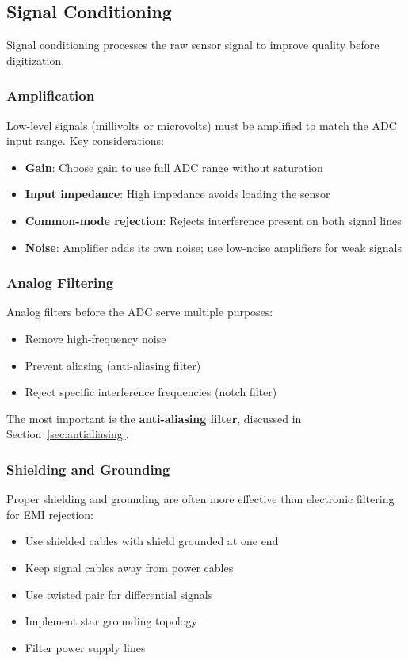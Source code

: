\subsection{Signal Conditioning}

Signal conditioning processes the raw sensor signal to improve quality before digitization.

\subsubsection{Amplification}

Low-level signals (millivolts or microvolts) must be amplified to match the ADC input range. Key considerations:
\begin{itemize}
    \item \textbf{Gain}: Choose gain to use full ADC range without saturation
    \item \textbf{Input impedance}: High impedance avoids loading the sensor
    \item \textbf{Common-mode rejection}: Rejects interference present on both signal lines
    \item \textbf{Noise}: Amplifier adds its own noise; use low-noise amplifiers for weak signals
\end{itemize}

\subsubsection{Analog Filtering}

Analog filters before the ADC serve multiple purposes:
\begin{itemize}
    \item Remove high-frequency noise
    \item Prevent aliasing (anti-aliasing filter)
    \item Reject specific interference frequencies (notch filter)
\end{itemize}

The most important is the \textbf{anti-aliasing filter}, discussed in Section~\ref{sec:antialiasing}.

\subsubsection{Shielding and Grounding}

Proper shielding and grounding are often more effective than electronic filtering for EMI rejection:
\begin{itemize}
    \item Use shielded cables with shield grounded at one end
    \item Keep signal cables away from power cables
    \item Use twisted pair for differential signals
    \item Implement star grounding topology
    \item Filter power supply lines
\end{itemize}

